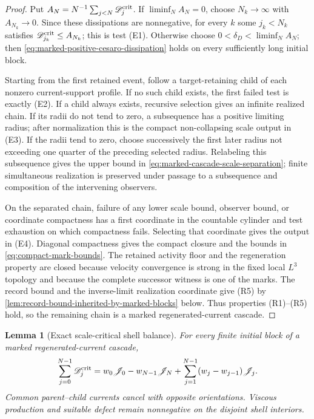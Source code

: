 \documentclass[11pt]{amsart}
\numberwithin{equation}{section}
\theoremstyle{plain}
\newtheorem{lemma}[lemma]{Lemma}
\theoremstyle{definition}
\theoremstyle{remark}
\begin{document}
\begin{proof}
Put \(A_N=N^{-1}\sum_{j<N}\mathscr D_j^{\rm crit}\).  If \(\liminf_NA_N=0\), choose
\(N_k\to\infty\) with \(A_{N_k}\to0\).  Since these dissipations are nonnegative,
for every \(k\) some \(j_k<N_k\) satisfies
\(\mathscr D_{j_k}^{\rm crit}\le A_{N_k}\); this is test \textup{(E1)}.
Otherwise choose \(0<\delta_D<\liminf_NA_N\); then
\eqref{eq:marked-positive-cesaro-dissipation} holds on every sufficiently long
initial block.

Starting from the first retained event, follow a target-retaining child of
each nonzero current-support profile.  If no such child exists, the first
failed test is exactly \textup{(E2)}.  If a child always exists, recursive
selection gives an infinite realized chain.  If its radii do not tend
to zero, a subsequence has a positive limiting radius; after normalization
this is the compact non-collapsing scale output in \textup{(E3)}.  If the
radii tend to zero, choose successively the first later radius not exceeding
one quarter of the preceding selected radius.  Relabeling this subsequence
gives the upper bound in \eqref{eq:marked-cascade-scale-separation}; finite
simultaneous realization is preserved under passage to a subsequence and
composition of the intervening observers.

On the separated chain, failure of any lower scale bound, observer bound, or
coordinate compactness has a first coordinate in the countable cylinder and
test exhaustion on which compactness fails.  Selecting that coordinate gives
the output in \textup{(E4)}.  Diagonal compactness gives the compact closure
and the bounds in
\eqref{eq:compact-mark-bounds}.  The retained activity floor and the
regeneration property are closed because velocity convergence is strong in
the fixed local \(L^3\) topology and because the complete successor witness is
one of the marks.  The record bound and the inverse-limit realization
coordinate give \textup{(R5)} by
\cref{lem:record-bound-inherited-by-marked-blocks} below.  Thus properties
\textup{(R1)}--\textup{(R5)} hold, so the
remaining chain is a marked regenerated-current cascade.
\end{proof}

\begin{lemma}[Exact scale-critical shell balance]
\label{lem:marked-critical-shell-balance}
For every finite initial block of a marked regenerated-current cascade,
\begin{equation}\label{eq:marked-critical-shell-balance}
 \sum_{j=0}^{N-1}\mathscr D_j^{\rm crit}
 =w_0\mathscr J_0-w_{N-1}\mathscr J_N
  +\sum_{j=1}^{N-1}(w_j-w_{j-1})\mathscr J_j .
\end{equation}
Common parent--child currents cancel with opposite orientations.  Viscous
production and suitable defect remain nonnegative on the disjoint shell
interiors.
\end{lemma}
\end{document}
